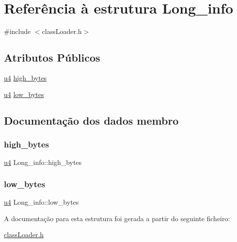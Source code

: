\hypertarget{struct_long__info}{}\section{Referência à estrutura Long\+\_\+info}
\label{struct_long__info}


{\ttfamily \#include $<$class\+Loader.\+h$>$}

\subsection*{Atributos Públicos}
\begin{DoxyCompactItemize}
\item 
\hyperlink{util_8h_ae391a1d79bb0c8cbc283f0283e3c098b}{u4} \hyperlink{struct_long__info_abede26c3423248c6ab0567530162f0f9}{high\+\_\+bytes}
\item 
\hyperlink{util_8h_ae391a1d79bb0c8cbc283f0283e3c098b}{u4} \hyperlink{struct_long__info_a39f9c34e2ed237b48065be6bc324423d}{low\+\_\+bytes}
\end{DoxyCompactItemize}


\subsection{Documentação dos dados membro}
\mbox{\label{struct_long__info_abede26c3423248c6ab0567530162f0f9}} 
\subsubsection{\texorpdfstring{high\+\_\+bytes}{high\_bytes}}
{\footnotesize\ttfamily \hyperlink{util_8h_ae391a1d79bb0c8cbc283f0283e3c098b}{u4} Long\+\_\+info\+::high\+\_\+bytes}

\mbox{\label{struct_long__info_a39f9c34e2ed237b48065be6bc324423d}} 
\subsubsection{\texorpdfstring{low\+\_\+bytes}{low\_bytes}}
{\footnotesize\ttfamily \hyperlink{util_8h_ae391a1d79bb0c8cbc283f0283e3c098b}{u4} Long\+\_\+info\+::low\+\_\+bytes}



A documentação para esta estrutura foi gerada a partir do seguinte ficheiro\+:\begin{DoxyCompactItemize}
\item 
\hyperlink{class_loader_8h}{class\+Loader.\+h}\end{DoxyCompactItemize}
